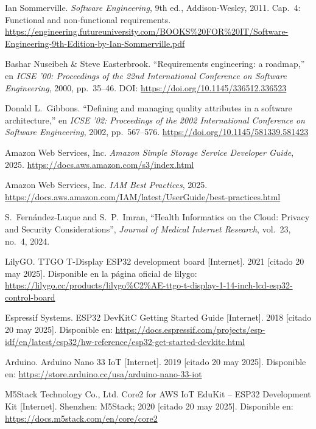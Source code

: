 \documentclass[12pt, a4paper]{article}
\begin{document}
\begin{thebibliography}{9}
	Ian Sommerville.
	\textit{Software Engineering}, 9th ed.,
	Addison‐Wesley, 2011. Cap. 4: Functional and non‐functional requirements.
	\url{https://engineering.futureuniversity.com/BOOKS%20FOR%20IT/Software-Engineering-9th-Edition-by-Ian-Sommerville.pdf}
	

	Bashar Nuseibeh \& Steve Easterbrook.  
	``Requirements engineering: a roadmap,''  
	en \textit{ICSE '00: Proceedings of the 22nd International Conference on Software Engineering}, 2000, pp.~35--46.  
	DOI: \url{https://doi.org/10.1145/336512.336523}
	
	Donald L.\ Gibbons.  
	``Defining and managing quality attributes in a software architecture,''  
	en \textit{ICSE '02: Proceedings of the 2002 International Conference on Software Engineering}, 2002, pp.~567--576.  
	\url{https://doi.org/10.1145/581339.581423}
	
	
	Amazon Web Services, Inc.
	\textit{Amazon Simple Storage Service Developer Guide}, 2025.
	\url{https://docs.aws.amazon.com/s3/index.html}
	
	Amazon Web Services, Inc.
	\textit{IAM Best Practices}, 2025.
	\url{https://docs.aws.amazon.com/IAM/latest/UserGuide/best-practices.html}
	
	S.~Fernández-Luque and S.~P.~Imran,
	“Health Informatics on the Cloud: Privacy and Security Considerations”,
	\textit{Journal of Medical Internet Research}, vol.~23, no.~4, 2024.


	
	LilyGO. TTGO T-Display ESP32 development board [Internet]. 2021 [citado 20 may 2025]. Disponible en la página oficial de lilygo: \url{https://lilygo.cc/products/lilygo%C2%AE-ttgo-t-display-1-14-inch-lcd-esp32-control-board}
	
	Espressif Systems. ESP32 DevKitC Getting Started Guide [Internet]. 2018 [citado 20 may 2025]. Disponible en: \url{https://docs.espressif.com/projects/esp-idf/en/latest/esp32/hw-reference/esp32-get-started-devkitc.html}
	

	
	Arduino. Arduino Nano 33 IoT [Internet]. 2019 [citado 20 may 2025]. Disponible en: \url{https://store.arduino.cc/usa/arduino-nano-33-iot}


	M5Stack Technology Co., Ltd. Core2 for AWS IoT EduKit – ESP32 Development Kit [Internet]. Shenzhen: M5Stack; 2020 [citado 20 may 2025]. Disponible en: \url{https://docs.m5stack.com/en/core/core2}


\end{thebibliography}
\end{document}

